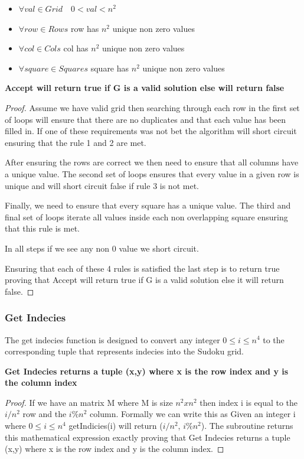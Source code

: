 \documentclass{sig-alternate}
\begin{document}
\begin{itemize}
\item{$\forall val \in Grid \quad 0 < val < n^2$} 
\item{$\forall row \in Rows$ row has $n^2$ unique non zero values}
\item{$\forall col \in Cols$ col has $n^2$ unique non zero values}
\item{$\forall square \in Squares$ square has $n^2$ unique non zero values}
\end{itemize}

\textbf{Accept will return true if G is a valid solution else will return false}
\begin{proof}
Assume we have valid grid then searching through each row in the first set of loops will ensure that there are no duplicates and that each value has been filled in. If one of these requirements was not bet the algorithm will short circuit ensuring that the rule 1 and 2 are met. 

After ensuring the rows are correct we then need to ensure that all columns have a unique value. The second set of loops ensures that every value in a given row is unique and will short circuit false if rule 3 is not met. 

Finally, we need to ensure that every square has a unique value. The third and final set of loops iterate all values inside each non overlapping square ensuring that this rule is met. 

In all steps if we see any non 0 value we short circuit. 

Ensuring that each of these 4 rules is satisfied the last step is to return true proving that Accept will return true if G is a valid solution else it will return false. 
\end{proof}

\subsubsection{Get Indecies}
The get indecies function is designed to convert any integer $0 \le i \le n^4$ to the corresponding tuple that represents indecies into the Sudoku grid.

\textbf{Get Indecies returns a tuple (x,y) where x is the row index and y is the column index}
\begin{proof}
If we have an matrix M where M is size $n^2 x n^2$ then index i is equal to the $i/n^2$ row and the $i\%n^2$ column. Formally we can write this as Given an integer i where $0 \le i \le n^4$ getIndicies(i) will return ($i/n^2$, $i\%n^2$). The subroutine returns this mathematical expression exactly proving that Get Indecies returns a tuple (x,y) where x is the row index and y is the column index.
\end{proof}
\end{document}
